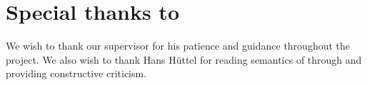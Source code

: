 \section*{Special thanks to}

We wish to thank our supervisor for his patience and guidance throughout
the project. We also wish to thank Hans Hüttel for reading semantics of
\productname{} through and providing constructive criticism.





